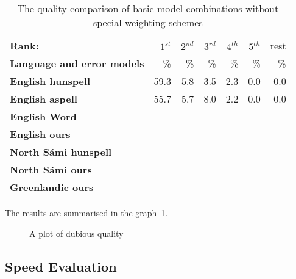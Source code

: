 \documentclass[a4paper,12pt]{article}
\begin{document}
\begin{table}
    \centering
    \begin{tabular}{|l|r|r|r|r|r|r|}
        \hline
        \bf Rank: & $1^{st}$ & $2^{nd}$ & $3^{rd}$ & $4^{th}$ & $5^{th}$ & rest \\
        \bf Language and error models &  \% & \% & \% & \% & \% & \% \\
        \hline
        \bf English hunspell & 59.3 & 5.8 & 3.5 & 2.3 & 0.0 & 0.0 \\
          \bf English aspell & 55.7 & 5.7 & 8.0 & 2.2 & 0.0 & 0.0 \\
            \bf English Word & & & & & &  \\
            \bf English ours & & & & & & \\
        \hline
        \bf North Sámi hunspell & & & & & & \\
            \bf North Sámi ours & & & & & & \\
        \hline
        \bf Greenlandic ours & & & & & & \\
        \hline
    \end{tabular}
    \caption{The quality comparison of basic model combinations without special
    weighting schemes\label{table:commercial-quality}}
\end{table}

The results are summarised in the graph~\ref{fig:quality}.

\begin{figure}
    \centering
    \caption{A plot of dubious quality
    \label{fig:quality}}
\end{figure}


\subsection{Speed Evaluation}
\end{document}
